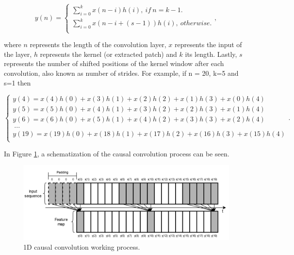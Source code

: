 \begin{equation}
y(n)=
    \begin{cases} 
            
        \sum_{i=0}^k x(n-i)h(i),\  if \  n=k-1.\\
        \sum_{i=0}^k x(n-i+(s-1))h(i),\  otherwise.\\
    
    \end{cases} ,
\end{equation}

where $n$ represents the length of the convolution layer, $x$ represents the input of the layer, $h$ represents the kernel (or extracted patch) and $k$ its length. Lastly, $s$ represents the number of shifted positions of the kernel window after each convolution, also known as number of strides. For example, if n = 20, k=5 and s=1 then

\begin{equation}
    \begin{cases} 
        y(4)=x(4)h(0)+x(3)h(1)+x(2)h(2)+x(1)h(3)+x(0)h(4)\\
        y(5)=x(5)h(0)+x(4)h(1)+x(3)h(2)+x(2)h(3)+x(1)h(4)\\
        y(6)=x(6)h(0)+x(5)h(1)+x(4)h(2)+x(3)h(3)+x(2)h(4)\\
        \  ...\\
        y(19)=x(19)h(0)+x(18)h(1)+x(17)h(2)+x(16)h(3)+x(15)h(4)\\
    \end{cases} .
    \label{noncausal}
\end{equation}

In Figure \ref{conv2}, a schematization of the causal convolution process can be seen.

\begin{figure}[h!]
    \centering
    \begin{center}
    \includegraphics[width=1\textwidth]{Images/conv2.png}
    \caption{1D causal convolution working process.}
    \label{conv2}
    \end{center}
\end{figure}

